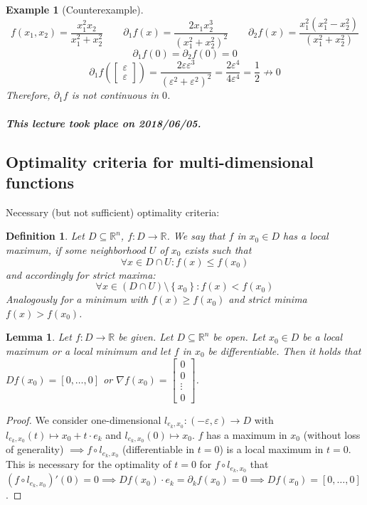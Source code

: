 \documentclass{article}
\newtheorem{example}{Example}  \numberwithin{example}{section}
\newtheorem{definition}{Definition}  \numberwithin{definition}{section}
\newtheorem{lemma}{Lemma}  \numberwithin{lemma}{section}
\newcommand{\set}[1]{\left\{#1\right\}}
\newcommand{\dateref}[1]{\paragraph{\textit{This lecture took place on #1.}}}
\begin{document}
\begin{example}[Counterexample]
  \[
    f(x_1, x_2) = \frac{x_1^2 x_2}{x_1^2 + x_2^2}
    \qquad \partial_1 f(x) = \frac{2x_1 x_2^3}{(x_1^2 + x_2^2)^2}
    \qquad \partial_2 f(x) = \frac{x_1^2 (x_1^2 - x_2^2)}{(x_1^2 + x_2^2)}
  \] \[
    \partial_1 f(0) = \partial_2 f(0) = 0
  \] \[
    \partial_1f(\begin{bmatrix} \varepsilon \\ \varepsilon \end{bmatrix}) = \frac{2 \varepsilon \varepsilon^3}{(\varepsilon^2 + \varepsilon^2)^2} = \frac{2\varepsilon^4}{4 \varepsilon^4} = \frac12 \not\to 0
  \]
  Therefore, $\partial_1 f$ is not continuous in $0$.
\end{example}

\dateref{2018/06/05}

\subsection{Optimality criteria for multi-dimensional functions}

Necessary (but not sufficient) optimality criteria:
\begin{definition} %
  Let $D \subseteq \mathbb R^n$, $f: D \to \mathbb R$.
  We say that $f$ in $x_0 \in D$ has a local maximum, if some neighborhood $U$ of $x_0$ exists such that
  \[ \forall x \in D \cap U: f(x) \leq f(x_0) \]
  and accordingly for strict maxima:
  \[ \forall x \in (D \cap U) \setminus \set{x_0}: f(x) < f(x_0) \]
  Analogously for a minimum with $f(x) \geq f(x_0)$ and strict minima $f(x) > f(x_0)$.
\end{definition}

\begin{lemma} %
  \label{l8}
  Let $f: D \to \mathbb R$ be given. Let $D \subseteq \mathbb R^n$ be open.
  Let $x_0 \in D$ be a local maximum or a local minimum and let $f$ in $x_0$ be differentiable.
  Then it holds that $Df(x_0) = [0, \dots, 0]$ or $\nabla f(x_0) = \begin{bmatrix} 0 \\ 0 \\ \vdots \\ 0 \end{bmatrix}$.
\end{lemma}

\begin{proof}
  We consider one-dimensional $l_{e_k,x_0}: (-\varepsilon, \varepsilon) \to D$ with $l_{e_k, x_0}(t) \mapsto x_0 + t \cdot e_k$
  and $l_{e_k, x_0}(0) \mapsto x_0$. $f$ has a maximum in $x_0$ (without loss of generality) $\implies f \circ l_{e_k,x_0}$ (differentiable in $t = 0$) is a local maximum in $t = 0$. This is necessary for the optimality of $t = 0$ for $f \circ l_{e_k,x_0}$ that $(f \circ l_{e_k,x_0})'(0) = 0 \implies Df(x_0) \cdot e_k = \partial_k f(x_0) = 0 \implies Df(x_0) = [0, \dots, 0]$.
\end{proof}
\end{document}
